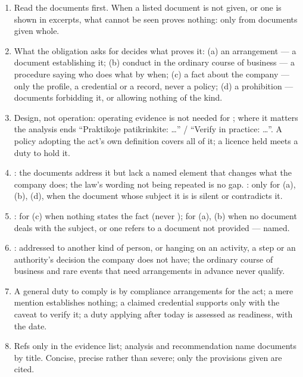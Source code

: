 \begin{enumerate}[itemsep=1pt, topsep=3pt]
  \item Read the documents first. When a listed document is not given, or one is shown in
    excerpts, what cannot be seen proves nothing:  only from documents given whole.
  \item What the obligation asks for decides what proves it: (a) an arrangement --- a document
    establishing it; (b) conduct in the ordinary course of business --- a procedure saying who
    does what by when; (c) a fact about the company --- only the profile, a credential or a
    record, never a policy; (d) a prohibition --- documents forbidding it, or allowing nothing of
    the kind.
  \item Design, not operation: operating evidence is not needed for ; where it
    matters the analysis ends \enquote{Praktikoje patikrinkite: …} / \enquote{Verify in
    practice: …}. A policy adopting the act's own definition covers all of it; a licence held
    meets a duty to hold it.
  \item {}: the documents address it but lack a named element that changes what the
    company does; the law's wording not being repeated is no gap. : only for (a),
    (b), (d), when the document whose subject it is is silent or contradicts it.
  \item {}: for (c) when nothing states the fact (never ); for (a), (b)
    when no document deals with the subject, or one refers to a document not provided --- named.
  \item {}: addressed to another kind of person, or hanging on an activity, a
    step or an authority's decision the company does not have; the ordinary course of business
    and rare events that need arrangements in advance never qualify.
  \item A general duty to comply is  by compliance arrangements for the act; a mere
    mention establishes nothing; a claimed credential supports  only with the caveat
    to verify it; a duty applying after today is assessed as readiness, with the date.
  \item Refs only in the evidence list; analysis and recommendation name documents by title.
    Concise, precise rather than severe; only the provisions given are cited.
\end{enumerate}

